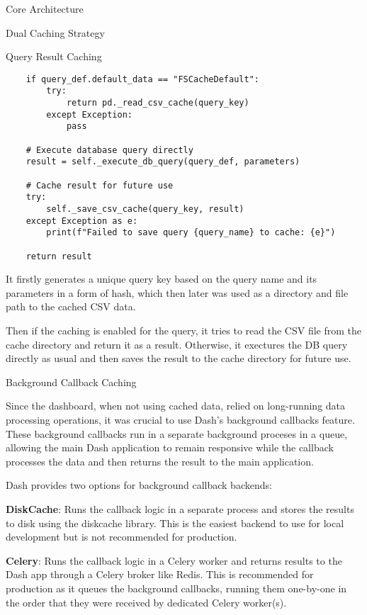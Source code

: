 \begin{section}{Core Architecture}
\begin{subsection}{Dual Caching Strategy}
\begin{subsubsection}{Query Result Caching}
\begin{listing}[H]
\begin{verbatim}
    if query_def.default_data == "FSCacheDefault":
        try:
            return pd._read_csv_cache(query_key)
        except Exception:
            pass

    # Execute database query directly
    result = self._execute_db_query(query_def, parameters)

    # Cache result for future use
    try:
        self._save_csv_cache(query_key, result)
    except Exception as e:
        print(f"Failed to save query {query_name} to cache: {e}")

    return result
				\end{verbatim}
				\label{lst:dashboard-implementation-query-cache}
			\end{listing}

			It firstly generates a unique query key based on the query name and its parameters in a form of hash, which then later was used as a directory and file path to the cached CSV data.

			Then if the caching is enabled for the query, it tries to read the CSV file from the cache directory and return it as a result.
			Otherwise, it exectures the DB query directly as usual and then saves the result to the cache directory for future use.
		\end{subsubsection}

		\begin{subsubsection}{Background Callback Caching}
			\label{subsubsec:implementation-core-architecture-callback-cache}

			Since the dashboard, when not using cached data, relied on long-running data processing operations, it was crucial to use Dash's background callbacks feature.
			These background callbacks run in a separate background proceses in a queue, allowing the main Dash application to remain responsive while the callback processes the data and then returns the result to the main application\cite{plotly_dash_plotly_com_background_callbacks}.

			Dash provides two options for background callback backends:

			\textbf{DiskCache}: Runs the callback logic in a separate process and stores the results to disk using the diskcache library.
			This is the easiest backend to use for local development but is not recommended for production.

			\textbf{Celery}: Runs the callback logic in a Celery worker\cite{celery_userguide_workers} and returns results to the Dash app through a Celery broker like Redis.
			This is recommended for production as it queues the background callbacks, running them one-by-one in the order that they were received by dedicated Celery worker(s).


\end{subsubsection}
\end{subsection}
\end{section}
